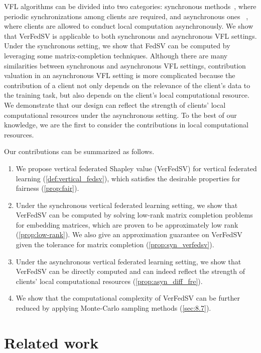 VFL algorithms can be divided into two categories: synchronous methods~\cite{Gong2016PrivateDA,Zhang2018FeatureDistributedSF,liu2019communication}, where periodic synchronizations
 among clients are required, and asynchronous ones
 ~\cite{Hu2019FDMLAC,Gu2020PrivacyPreservingAF,chen2020vafl}, where clients are allowed to conduct local computation asynchronously. We show that VerFedSV is applicable to both synchronous and asynchronous VFL settings. Under the synchronous setting, we show that FedSV can be computed by leveraging some matrix-completion techniques. Although there are many similarities between synchronous and asynchronous VFL settings, contribution valuation in an asynchronous VFL setting is more complicated because the contribution of a client not only depends on the relevance of the client's data to the training task, but also depends on the client's local computational resource. We demonstrate that our design can reflect the strength of clients' local computational resources under the asynchronous setting. To the best of our knowledge, we are the first to consider the contributions in local computational resources.

Our contributions can be summarized as follows.
\begin{enumerate}
    \item We propose vertical federated Shapley value (VerFedSV) for vertical federated learning (\autoref{def:vertical_fedsv}), which satisfies the desirable properties for fairness (\autoref{prop:fair}). 
    \item Under the synchronous vertical federated learning setting, we show that VerFedSV can be computed by solving low-rank matrix completion problems for embedding matrices, which are proven to be approximately low rank (\autoref{prop:low-rank}). We also give an approximation guarantee on VerFedSV given the tolerance for matrix completion (\autoref{prop:syn_verfedsv}).
    \item Under the asynchronous vertical federated learning setting, we show that VerFedSV can be directly computed and can indeed reflect the strength of clients' local computational resources (\autoref{prop:asyn_diff_fre}).
    \item We show that the computational complexity of VerFedSV can be further reduced by applying Monte-Carlo sampling methods (\autoref{sec:8.7}). 
\end{enumerate}

\section{Related work} \label{sec:8.2}

